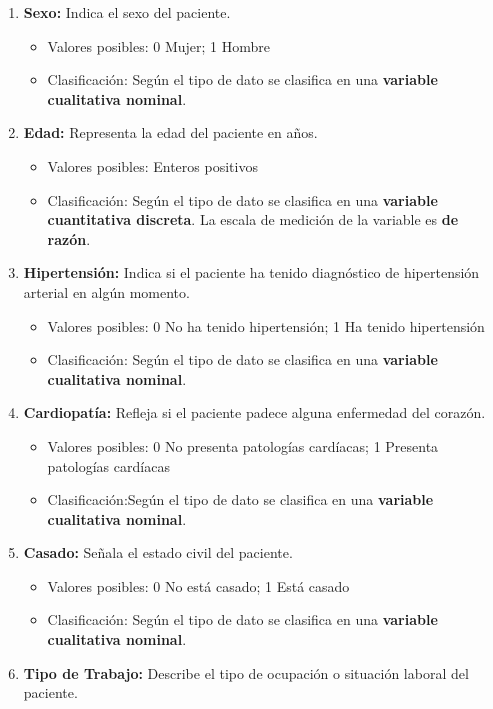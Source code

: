 \documentclass[a4paper, 12pt]{article}
\begin{document}
\begin{enumerate}

\item \textbf{Sexo:} Indica el sexo del paciente.
    \begin{itemize}
    \item Valores posibles: 0 Mujer; 1 Hombre
    \item Clasificación: Según el tipo de dato se clasifica en una \textbf{variable cualitativa nominal}.
    \end{itemize}
\item \textbf{Edad:}  Representa la edad del paciente en años.
    \begin{itemize}
    \item Valores posibles: Enteros positivos
    \item Clasificación: Según el tipo de dato se clasifica en una \textbf{variable cuantitativa discreta}. La escala de medición de la variable es \textbf{de razón}.
    \end{itemize}
\item \textbf{Hipertensión:}  Indica si el paciente ha tenido diagnóstico de hipertensión arterial en algún momento.
    \begin{itemize}
    \item Valores posibles: 0 No ha tenido hipertensión; 1 Ha tenido hipertensión
    \item Clasificación: Según el tipo de dato se clasifica en una \textbf{variable cualitativa nominal}.
    \end{itemize}
\item \textbf{Cardiopatía:} Refleja si el paciente padece alguna enfermedad del corazón.
    \begin{itemize}
    \item Valores posibles: 0 No presenta patologías cardíacas; 1 Presenta patologías cardíacas
    \item Clasificación:Según el tipo de dato se clasifica en una \textbf{variable cualitativa nominal}.
    \end{itemize}
\item \textbf{Casado:} Señala el estado civil del paciente.
    \begin{itemize}
    \item Valores posibles: 0 No está casado; 1 Está casado
    \item Clasificación: Según el tipo de dato se clasifica en una \textbf{variable cualitativa nominal}.
    \end{itemize}
\item \textbf{Tipo de Trabajo:} Describe el tipo de ocupación o situación laboral del paciente.

\end{enumerate}
\end{document}
